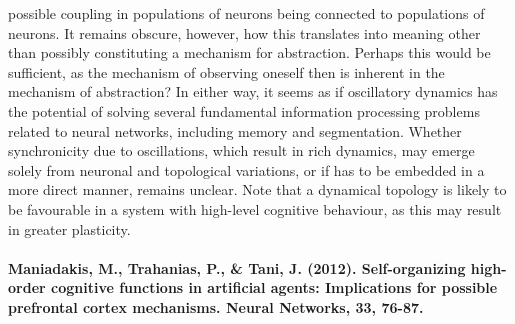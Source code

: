 possible coupling in populations of neurons being connected to populations of neurons. It remains obscure, however, how this translates into meaning other than possibly constituting a mechanism for abstraction. Perhaps this would be sufficient, as the mechanism of observing oneself then is inherent in the mechanism of abstraction? In either way, it seems as if oscillatory dynamics has the potential of solving several fundamental information processing problems related to neural networks, including memory and segmentation. Whether synchronicity due to oscillations, which result in rich dynamics, may emerge solely from neuronal and topological variations, or if has to be embedded in a more direct manner, remains unclear. Note that a dynamical topology is likely to be favourable in a system with high-level cognitive behaviour, as this may result in greater plasticity.
\\
\\
\textbf{Maniadakis, M., Trahanias, P., \& Tani, J. (2012). Self-organizing high-order cognitive functions in artificial agents: Implications for possible prefrontal cortex mechanisms. Neural Networks, 33, 76-87.}

